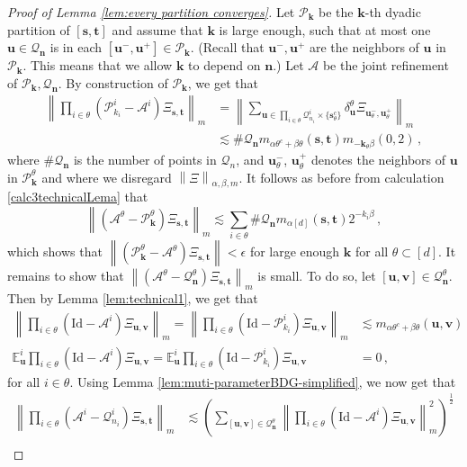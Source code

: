 \documentclass[11pt,oneside,english,reqno]{amsart}
\numberwithin{equation}{section}
\numberwithin{figure}{section}
\theoremstyle{plain}
\theoremstyle{definition}
\theoremstyle{remark}
\theoremstyle{plain}
\theoremstyle{plain}
\theoremstyle{plain}
\theoremstyle{plain}
\theoremstyle{plain}
\newcommand{\cA}{\mathcal{A}}
\newcommand{\cP}{\mathcal{P}}
\newcommand{\cQ}{\mathcal{Q}}
\newcommand{\EE}{\mathbb{E}}
\newcommand{\bk}{\mathbf{k}}
\newcommand{\bn}{\mathbf{n}}
\newcommand{\bu}{\mathbf{u}}
\newcommand{\bv}{\mathbf{v}}
\newcommand{\bs}{\mathbf{s}}
\newcommand{\bt}{\mathbf{t}}
\newcommand{\Id}{\mathrm{Id}}
\newcommand{\norm}[1]{\left\lVert #1\right\rVert}
\begin{document}
\begin{proof}[Proof of Lemma \ref{lem:every partition converges}]
    Let $\cP_\bk$ be the $\bk$-th dyadic partition of $[\bs,\bt]$ and assume that $\bk$ is large enough, such that at most one $\bu\in\cQ_\bn$ is in each $[\bu^-,\bu^+]\in\cP_\bk$. (Recall that $\bu^-,\bu^+$ are the neighbors of $\bu$ in $\cP_\bk$. This means that we allow $\bk$ to depend on $\bn$.) Let $\cA$ be the joint refinement of $\cP_\bk,\cQ_\bn$. By construction of $\cP_\bk$, we get that
%
    \begin{align*}
        \norm{\prod_{i\in\theta}(\cP^i_{k_i}-\cA^i)\Xi_{\bs,\bt}}_m &= \norm{\sum_{\bu\in\prod_{i\in\theta}\cQ^i_{n_i}\times\{\bs_\theta^c\}}\delta^\theta_\bu \Xi_{\bu_\theta^-,\bu_\theta^+}}_m\\
        &\lesssim \#\cQ_\bn m_{\alpha\theta^c+\beta\theta}(\bs,\bt)m_{-\bk_\theta\beta}(0,2)\,,
    \end{align*}
%
    where $\#\cQ_\bn$ is the number of points in $\cQ_n$, and $\bu^-_\theta$, $\bu^+_\theta$ denotes the neighbors of $\bu$ in $\cP^\theta_\bk$ and where we disregard $\norm{\Xi}_{\alpha,\beta,m}$.  It follows as before from calculation \eqref{calc3technicalLema} that
%
    \begin{equation*}
        \norm{(\cA^\theta-\cP^\theta_\bk)\Xi_{\bs,\bt}}_m \lesssim \sum_{i\in\theta}\#\cQ_\bn m_{\alpha[d]}(\bs,\bt) 2^{-k_i\beta}\,,
    \end{equation*}
%
    which shows that $\norm{(\cP^\theta_\bk-\cA^\theta)\Xi_{\bs,\bt}}<\epsilon$ for large enough $\bk$ for all $\theta\subset [d]$.
%
    It remains to show that $\norm{(\cA^\theta-\cQ_\bn^\theta)\Xi_{\bs,\bt}}_m$ is small. To do so, let $[\bu,\bv]\in \cQ^\theta_\bn$. Then by Lemma \ref{lem:technical1}, we get that
%
    \begin{align*}
        \norm{\prod_{i\in\theta}(\Id-\cA^i)\Xi_{\bu,\bv}}_m = \norm{\prod_{i\in\theta}(\Id-\cP_{k_i}^i)\Xi_{\bu,\bv}}_m &\lesssim m_{\alpha\theta^c+\beta\theta}    (\bu,\bv)\\
        \EE^i_\bu \prod_{i\in\theta}(\Id-\cA^i)\Xi_{\bu,\bv} = \EE^i_\bu \prod_{i\in\theta}(\Id-\cP_{k_i}^i)\Xi_{\bu,\bv} &= 0\,,
    \end{align*}
%
    for all $i\in\theta$. Using Lemma \ref{lem:muti-parameterBDG-simplified}, we now get that
%
    \begin{align*}
        \norm{\prod_{i\in\theta}(\cA^i-\cQ^i_{n_i})\Xi_{\bs,\bt}}_m &\lesssim \left(\sum_{[\bu,\bv]\in\cQ_\bn^\theta}\norm{\prod_{i\in\theta}(\Id-\cA^i)\Xi_{\bu,\bv}}_m^2\right)^{\frac 12}\\

\end{align*}
\end{proof}
\end{document}
